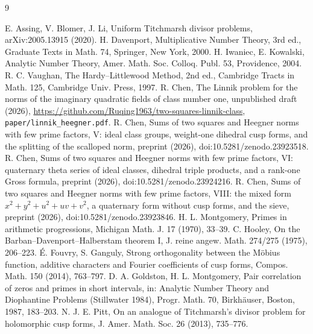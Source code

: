 \documentclass[11pt]{amsart}
\theoremstyle{remark}
\begin{document}
\begin{thebibliography}{9}\raggedright
{} E. Assing, V. Blomer, J. Li, Uniform Titchmarsh divisor problems, arXiv:2005.13915 (2020).
 H. Davenport, Multiplicative Number Theory, 3rd ed., Graduate Texts in Math. 74, Springer, New York, 2000.
 H. Iwaniec, E. Kowalski, Analytic Number Theory, Amer. Math. Soc. Colloq. Publ. 53, Providence, 2004.
 R. C. Vaughan, The Hardy--Littlewood Method, 2nd ed., Cambridge Tracts in Math. 125, Cambridge Univ. Press, 1997.
 R. Chen, The Linnik problem for the norms of the imaginary quadratic fields of class number one, unpublished draft (2026), \url{https://github.com/Ruqing1963/two-squares-linnik-class}, \texttt{paper/linnik\_heegner.pdf}.
 R. Chen, Sums of two squares and Heegner norms with few prime factors, V: ideal class groups, weight-one dihedral cusp forms, and the splitting of the scalloped norm, preprint (2026), doi:10.5281/zenodo.23923518.
 R. Chen, Sums of two squares and Heegner norms with few prime factors, VI: quaternary theta series of ideal classes, dihedral triple products, and a rank-one Gross formula, preprint (2026), doi:10.5281/zenodo.23924216.
 R. Chen, Sums of two squares and Heegner norms with few prime factors, VIII: the mixed form $x^2+y^2+u^2+uv+v^2$, a quaternary form without cusp forms, and the sieve, preprint (2026), doi:10.5281/zenodo.23923846.
 H. L. Montgomery, Primes in arithmetic progressions, Michigan Math. J. 17 (1970), 33--39.
 C. Hooley, On the Barban--Davenport--Halberstam theorem I, J. reine angew. Math. 274/275 (1975), 206--223.
 \'E. Fouvry, S. Ganguly, Strong orthogonality between the M\"obius function, additive characters and Fourier coefficients of cusp forms, Compos. Math. 150 (2014), 763--797.
 D. A. Goldston, H. L. Montgomery, Pair correlation of zeros and primes in short intervals, in: Analytic Number Theory and Diophantine Problems (Stillwater 1984), Progr. Math. 70, Birkh\"auser, Boston, 1987, 183--203.
 N. J. E. Pitt, On an analogue of Titchmarsh's divisor problem for holomorphic cusp forms, J. Amer. Math. Soc. 26 (2013), 735--776.
\end{thebibliography}
\end{document}
